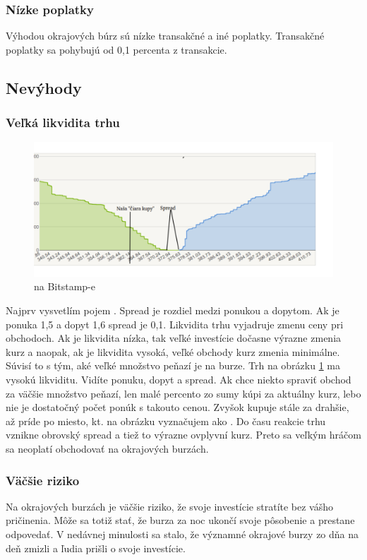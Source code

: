 \subsubsection{Nízke poplatky} 
Výhodou okrajových búrz sú nízke transakčné a iné poplatky. Transakčné poplatky sa pohybujú od 0,1 percenta z transakcie. 
\subsection{Nevýhody} 
\subsubsection{Veľká likvidita trhu} 
\begin{figure}[!hbt] 
\begin{center} 
\includegraphics[width=1\textwidth]{stamp} 
\caption{ na Bitstamp-e} 
\label{img:ob} 
\end{center} 
\end{figure} 
Najprv vysvetlím pojem \cite{ZAC}. Spread je rozdiel medzi ponukou a dopytom. Ak je ponuka 1,5 a dopyt 1,6 spread je 0,1. Likvidita trhu vyjadruje zmenu ceny pri obchodoch. Ak je likvidita nízka, tak veľké investície dočasne výrazne zmenia kurz a naopak, ak je likvidita vysoká, veľké obchody kurz zmenia minimálne. Súvisí to s tým, aké veľké množstvo peňazí je na burze. Trh na obrázku \ref{img:ob} ma vysokú likviditu. Vidíte ponuku, dopyt a spread. Ak chce niekto spraviť obchod za väčšie množstvo peňazí, len malé percento zo sumy kúpi za aktuálny kurz, lebo nie je dostatočný počet ponúk s takouto cenou. Zvyšok kupuje stále za drahšie, až príde po miesto, kt. na obrázku vyznačujem ako . Do času reakcie trhu vznikne obrovský spread a tiež to výrazne ovplyvní kurz. Preto sa veľkým hráčom sa neoplatí obchodovať na okrajových burzách. 
\subsubsection{Väčšie riziko} 
Na okrajových burzách je väčšie riziko, že svoje investície stratíte bez vášho pričinenia. Môže sa totiž stať, že burza za noc ukončí svoje pôsobenie a prestane odpovedať. V nedávnej minulosti sa stalo, že významné okrajové burzy zo dňa na deň zmizli a ľudia prišli o svoje investície.  
